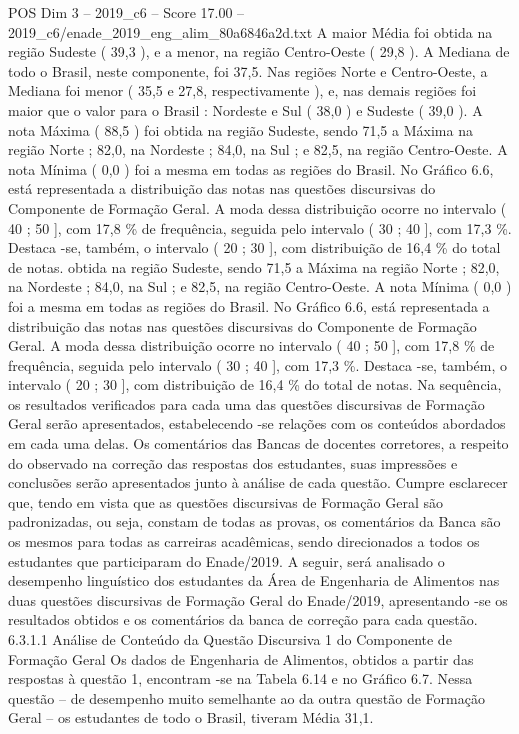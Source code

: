 \begin{textsample}{POS Dim 3 – 2019\_c6 – Score 17.00 – 2019\_c6/enade\_2019\_eng\_alim\_80a6846a2d.txt}
A maior Média foi obtida na região Sudeste ( 39,3 ), e a menor, na região Centro-Oeste ( 29,8 ).
A Mediana de todo o Brasil, neste componente, foi 37,5.
Nas regiões Norte e Centro-Oeste, a Mediana foi menor ( 35,5 e 27,8, respectivamente ), e, nas demais regiões foi maior que o valor para o Brasil : Nordeste e Sul ( 38,0 ) e Sudeste ( 39,0 ).
A nota Máxima ( 88,5 ) foi obtida na região Sudeste, sendo 71,5 a Máxima na região Norte ; 82,0, na Nordeste ; 84,0, na Sul ; e 82,5, na região Centro-Oeste.
A nota Mínima ( 0,0 ) foi a mesma em todas as regiões do Brasil.
No Gráfico 6.6, está representada a distribuição das notas nas questões discursivas do Componente de Formação Geral.
A moda dessa distribuição ocorre no intervalo ( 40 ; 50 ], com 17,8 \% de frequência, seguida pelo intervalo ( 30 ; 40 ], com 17,3 \%.
Destaca -se, também, o intervalo ( 20 ; 30 ], com distribuição de 16,4 \% do total de notas. obtida na região Sudeste, sendo 71,5 a Máxima na região Norte ; 82,0, na Nordeste ; 84,0, na Sul ; e 82,5, na região Centro-Oeste.
A nota Mínima ( 0,0 ) foi a mesma em todas as regiões do Brasil.
No Gráfico 6.6, está representada a distribuição das notas nas questões discursivas do Componente de Formação Geral.
A moda dessa distribuição ocorre no intervalo ( 40 ; 50 ], com 17,8 \% de frequência, seguida pelo intervalo ( 30 ; 40 ], com 17,3 \%.
Destaca -se, também, o intervalo ( 20 ; 30 ], com distribuição de 16,4 \% do total de notas.
Na sequência, os resultados verificados para cada uma das questões discursivas de Formação Geral serão apresentados, estabelecendo -se relações com os conteúdos abordados em cada uma delas.
Os comentários das Bancas de docentes corretores, a respeito do observado na correção das respostas dos estudantes, suas impressões e conclusões serão apresentados junto à análise de cada questão.
Cumpre esclarecer que, tendo em vista que as questões discursivas de Formação Geral são padronizadas, ou seja, constam de todas as provas, os comentários da Banca são os mesmos para todas as carreiras acadêmicas, sendo direcionados a todos os estudantes que participaram do Enade/2019.
A seguir, será analisado o desempenho linguístico dos estudantes da Área de Engenharia de Alimentos nas duas questões discursivas de Formação Geral do Enade/2019, apresentando -se os resultados obtidos e os comentários da banca de correção para cada questão. 6.3.1.1 Análise de Conteúdo da Questão Discursiva 1 do Componente de Formação Geral Os dados de Engenharia de Alimentos, obtidos a partir das respostas à questão 1, encontram -se na Tabela 6.14 e no Gráfico 6.7.
Nessa questão – de desempenho muito semelhante ao da outra questão de Formação Geral – os estudantes de todo o Brasil, tiveram Média 31,1.

\end{textsample}
